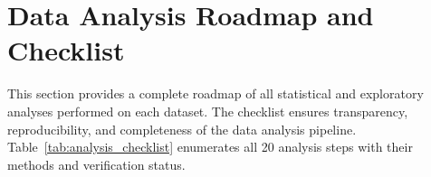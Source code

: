 \section{Data Analysis Roadmap and Checklist}
\label{app:analysis_checklist}

This section provides a complete roadmap of all statistical and exploratory analyses performed on each dataset. The checklist ensures transparency, reproducibility, and completeness of the data analysis pipeline. Table~\ref{tab:analysis_checklist} enumerates all 20 analysis steps with their methods and verification status.

